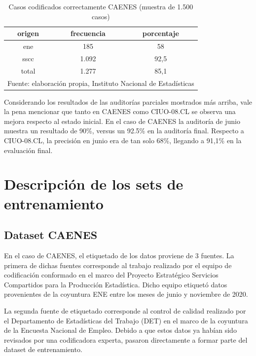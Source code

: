 \documentclass[
  12pt,
  spanish,
]{article}
\begin{document}
\begin{table}[H]

\caption{\label{tab:mostrar_tabla_audi_final}\label{caenes_audi_final}Casos codificados correctamente CAENES (muestra de 1.500 casos)}
\centering
\fontsize{9.5}{11.5}\selectfont
\begin{tabular}[t]{ccc}
\toprule
origen & frecuencia & porcentaje\\
\midrule
ene & 185 & 58\\
sscc & 1.092 & 92,5\\
total & 1.277 & 85,1\\
\bottomrule
\multicolumn{3}{l}{\rule{0pt}{1em}Fuente: elaboración propia, Instituto Nacional de Estadísticas }\\
\end{tabular}
\end{table}

Considerando los resultados de las auditorías parciales mostrados más
arriba, vale la pena mencionar que tanto en CAENES como CIUO-08.CL se
observa una mejora respecto al estado inicial. En el caso de CAENES la
auditoría de junio muestra un resultado de 90\%, versus un 92.5\% en la
auditoría final. Respecto a CIUO-08.CL, la precisión en junio era de tan
solo 68\%, llegando a 91,1\% en la evaluación final.

\newpage

\hypertarget{descripciuxf3n-de-los-sets-de-entrenamiento}{%
\section{Descripción de los sets de
entrenamiento}\label{descripciuxf3n-de-los-sets-de-entrenamiento}}

\hypertarget{dataset-caenes}{%
\subsection{Dataset CAENES}\label{dataset-caenes}}

En el caso de CAENES, el etiquetado de los datos proviene de 3 fuentes.
La primera de dichas fuentes corresponde al trabajo realizado por el
equipo de codificación conformado en el marco del Proyecto Estratégico
Servicios Compartidos para la Producción Estadística. Dicho equipo
etiquetó datos provenientes de la coyuntura ENE entre los meses de junio
y noviembre de 2020.

La segunda fuente de etiquetado corresponde al control de calidad
realizado por el Departamento de Estadísticas del Trabajo (DET) en el
marco de la coyuntura de la Encuesta Nacional de Empleo. Debido a que
estos datos ya habían sido revisados por una codificadora experta,
pasaron directamente a formar parte del dataset de entrenamiento.
\end{document}
